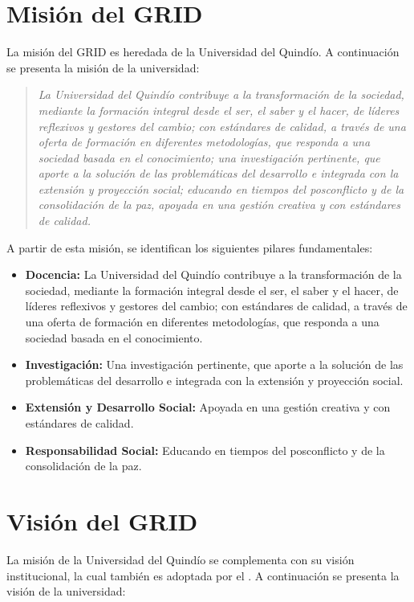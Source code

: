 \section{Misión del GRID}
\noindent
La misión del GRID es heredada de la Universidad del Quindío. A continuación se presenta la misión de la universidad:\@

\begin{quote}
\textit{La Universidad del Quindío contribuye a la transformación de la sociedad, mediante la formación integral desde el ser, el saber y el hacer, de líderes reflexivos y gestores del cambio; con estándares de calidad, a través de una oferta de formación en diferentes metodologías, que responda a una sociedad basada en el conocimiento; una investigación pertinente, que aporte a la solución de las problemáticas del desarrollo e integrada con la extensión y proyección social; educando en tiempos del posconflicto y de la consolidación de la paz, apoyada en una gestión creativa y con estándares de calidad.}
\end{quote}

A partir de esta misión, se identifican los siguientes pilares fundamentales:

\begin{itemize}
    \item \textbf{Docencia:} La Universidad del Quindío contribuye a la transformación de la sociedad, mediante la formación integral desde el ser, el saber y el hacer, de líderes reflexivos y gestores del cambio; con estándares de calidad, a través de una oferta de formación en diferentes metodologías, que responda a una sociedad basada en el conocimiento.

    \item \textbf{Investigación:} Una investigación pertinente, que aporte a la solución de las problemáticas del desarrollo e integrada con la extensión y proyección social.

    \item \textbf{Extensión y Desarrollo Social:} Apoyada en una gestión creativa y con estándares de calidad.

    \item \textbf{Responsabilidad Social:} Educando en tiempos del posconflicto y de la consolidación de la paz.
\end{itemize}

\section{Visión del GRID}
\noindent
La misión de la Universidad del Quindío se complementa con su visión institucional, la cual también es adoptada por el \GRID. A continuación se presenta la visión de la universidad:\@

